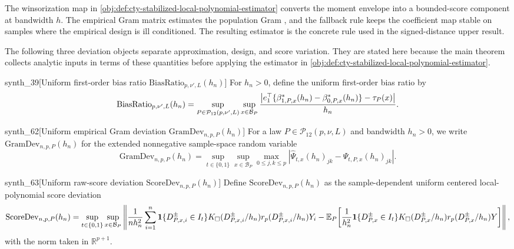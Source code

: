 The winsorization map  in \cref{obj:def:cty-stabilized-local-polynomial-estimator} converts the moment envelope into a bounded-score component at bandwidth \(h\). The empirical Gram matrix estimates the population Gram , and the fallback rule keeps the coefficient map stable on samples where the empirical design is ill conditioned. The resulting estimator  is the concrete rule used in the signed-distance upper result.

The following three deviation objects separate approximation, design, and score variation. They are stated here because the main theorem collects analytic inputs in terms of these quantities before applying the estimator in \cref{obj:def:cty-stabilized-local-polynomial-estimator}.

\begin{definitionv}{synth_39}[Uniform first-order bias ratio $\mathrm{BiasRatio}_{p,\nu',L}(h_n)$]
For $h_n>0$, define the uniform first-order bias ratio by \[ \mathrm{BiasRatio}_{p,\nu',L}(h_n)=\sup_{P\in\mathcal P_{12}(p,\nu',L)}\sup_{x\in\mathcal B_P}{\left|e_1^\top\{\beta^*_{1,P,x}(h_n)-\beta^*_{0,P,x}(h_n)\}-\tau_P(x)\right|\over h_n}. \]
\end{definitionv}

\begin{definitionv}{synth_62}[Uniform empirical Gram deviation \(\mathrm{GramDev}_{n,p,P}(h_n)\)]
For a law \(P\in\mathcal P_{12}(p,\nu,L)\) and bandwidth \(h_n>0\), we write \(\mathrm{GramDev}_{n,p,P}(h_n)\) for the extended nonnegative sample-space random variable\[\mathrm{GramDev}_{n,p,P}(h_n)=\sup_{t\in\{0,1\}}\sup_{x\in\mathcal B_P}\max_{0\leq j,k\leq p}\left|\widehat\Psi_{t,x}(h_n)_{jk}-\Psi_{t,P,x}(h_n)_{jk}\right|.\]
\end{definitionv}

\begin{definitionv}{synth_63}[Uniform raw-score deviation $\mathrm{ScoreDev}_{n,p,P}(h_n)$]
Define $\mathrm{ScoreDev}_{n,p,P}(h_n)$ as the sample-dependent uniform centered local-polynomial score deviation
\[
\mathrm{ScoreDev}_{n,p,P}(h_n)
=
\sup_{t\in\{0,1\}}\sup_{x\in\mathcal B_P}
\left\|
{1\over n h_n^2}\sum_{i=1}^n
\mathbf 1\{D^{\pm}_{P,x,i}\in I_t\}K_\square(D^{\pm}_{P,x,i}/h_n)r_p(D^{\pm}_{P,x,i}/h_n)Y_i
-
\mathbb E_P\!\left[
{1\over h_n^2}\mathbf 1\{D^{\pm}_{P,x}\in I_t\}K_\square(D^{\pm}_{P,x}/h_n)r_p(D^{\pm}_{P,x}/h_n)Y
\right]
\right\|,
\]
with the norm taken in $\mathbb R^{p+1}$.
\end{definitionv}

